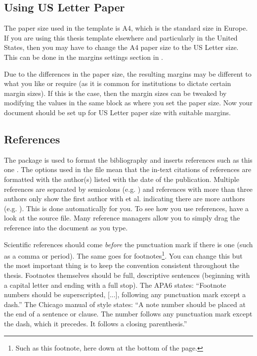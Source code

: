 \subsection{Using US Letter Paper}

The paper size used in the template is A4, which is the standard size in Europe. If you are using this thesis template elsewhere and particularly in the United States, then you may have to change the A4 paper size to the US Letter size. This can be done in the margins settings section in .

Due to the differences in the paper size, the resulting margins may be different to what you like or require (as it is common for institutions to dictate certain margin sizes). If this is the case, then the margin sizes can be tweaked by modifying the values in the same block as where you set the paper size. Now your document should be set up for US Letter paper size with suitable margins.

\subsection{References}

The  package is used to format the bibliography and inserts references such as this one \cite{Reference1}. The options used in the  file mean that the in-text citations of references are formatted with the author(s) listed with the date of the publication. Multiple references are separated by semicolons (e.g. \cite{Reference2, Reference1}) and references with more than three authors only show the first author with et al. indicating there are more authors (e.g. \cite{Reference3}). This is done automatically for you. To see how you use references, have a look at the  source file. Many reference managers allow you to simply drag the reference into the document as you type.

Scientific references should come \emph{before} the punctuation mark if there is one (such as a comma or period). The same goes for footnotes\footnote{Such as this footnote, here down at the bottom of the page.}. You can change this but the most important thing is to keep the convention consistent throughout the thesis. Footnotes themselves should be full, descriptive sentences (beginning with a capital letter and ending with a full stop). The APA6 states: \enquote{Footnote numbers should be superscripted, [...], following any punctuation mark except a dash.} The Chicago manual of style states: \enquote{A note number should be placed at the end of a sentence or clause. The number follows any punctuation mark except the dash, which it precedes. It follows a closing parenthesis.}

